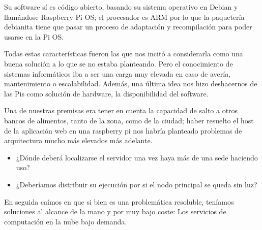 \vspace{1em}
\par Su software sí es código abierto, basando su sistema operativo en Debian y llamándose Raspberry Pi OS; el procesador es ARM por lo que la paquetería debianita tiene que pasar un proceso de adaptación y recompilación para poder usarse en la Pi OS.
\vspace{1em}
\par Todas estas características fueron las que nos incitó a considerarla como una buena solución a lo que se no estaba planteando. Pero el conocimiento de sistemas informáticos iba a ser una carga muy elevada en caso de avería, mantenimiento o escalabilidad. Además, una última idea nos hizo deshacernos de las Pis como solución de hardware, la disponibilidad del software.
\vspace{1em}
\par Una de nuestras premisas era tener en cuenta la capacidad de salto a otros bancos de alimentos, tanto de la zona, como de la ciudad; haber resuelto el host de la aplicación web en una raspberry pi nos habría planteado problemas de arquitectura mucho más elevados más adelante.
\begin{itemize}
    \item ¿Dónde deberá localizarse el servidor una vez haya más de una sede haciendo uso?
    \item ¿Deberíamos distribuir su ejecución por si el nodo principal se queda sin luz?
\end{itemize}
En seguida caímos en que si bien es una problemática resoluble, teníamos soluciones al alcance de la mano y por muy bajo coste: Los servicios de computación en la nube bajo demanda.
\clearpage
